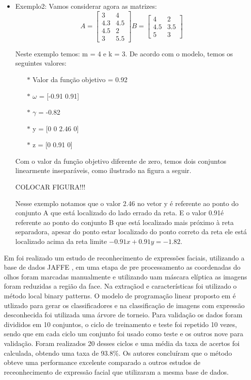 \begin{itemize}
\item Exemplo2:
Vamos  considerar agora as matrizes:
$$A=\begin{bmatrix}3 & 4\\ 4.3 & 4.5\\ 4.5 & 2\\ 3 & 5.5\end{bmatrix}
B=\begin{bmatrix}4 & 2\\ 4.5 & 3.5\\ 5 & 3\end{bmatrix}$$

Neste exemplo temos: m = 4 e k = 3. De acordo com o modelo, temos os seguintes valores:
\begin{itemize}
\item[$\ast$] Valor da função objetivo = 0.92
\item[$\ast$] $\omega$ = [-0.91  0.91]
\item[$\ast$] $\gamma$ = -0.82
\item[$\ast$] y = [0 0 2.46 0]
\item[$\ast$] z = [0 0.91 0]
\end{itemize}

Com o valor da função objetivo diferente de zero, temos dois conjuntos linearmente inseparáveis, como ilustrado na figura a seguir.

COLOCAR FIGURA!!!

Nesse exemplo notamos que o valor 2.46 no vetor y é referente ao ponto do conjunto A que está localizado do lado errado da reta. E o valor 0.91é referente ao ponto do conjunto B que está localizado mais próximo à reta separadora, apesar do ponto estar localizado do ponto correto da reta ele está localizado acima da reta limite $-0.91x + 0.91y = -1.82$.
\end{itemize}

Em  foi realizado um estudo de reconhecimento de expressões faciais, utilizando a base de dados JAFFE \cite{Jaffe}, em uma etapa de pre processamento as coordenadas do olhos foram marcadas manualmente e utilizando uam máscara elíptica as imagens foram reduzidas a região da face. Na extraçãod e características foi utilizado o método local binary patterns. O modelo de programação linear proposto em \cite{Bennett92robustlinear} é utlizado para gerar os classificadores e na classificação de imagens com expressão desconhecida foi utilizada uma árvore de torneio. Para validação os dados foram divididos em 10 conjuntos, o ciclo de treinamento e teste foi repetido 10 vezes, sendo que em cada ciclo um conjunto foi usado como teste e os outros nove para validação. Foram realizados 20 desses ciclos e uma média da taxa de acertos foi calculada, obtendo uma taxa de 93.8\%. Os autores concluíram que o método obteve uma performance excelente comparado a outros estudos de receonhecimento de expressão facial que utilizaram a mesma base de dados.

